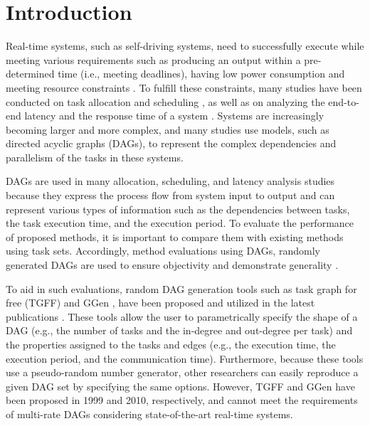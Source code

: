 \section{Introduction}
\label{sec: introduction}

Real-time systems, such as self-driving systems, need to successfully execute while meeting various requirements such as producing an output within a pre-determined time (i.e., meeting deadlines), having low power consumption and meeting resource constraints \cite{koike2021federated, senapati2021hmds, kaur2020deep}.
To fulfill these constraints, many studies have been conducted on task allocation and scheduling \cite{igarashi2021accurate, asghari2020online, tong2020ql}, as well as on analyzing the end-to-end latency and the response time of a system \cite{yang2020exploring, kordon2020evaluation, chen2021partial}.
Systems are increasingly becoming larger and more complex, and many studies use models, such as directed acyclic graphs (DAGs), to represent the complex dependencies and parallelism of the tasks in these systems.

DAGs are used in many allocation, scheduling, and latency analysis studies \cite{choi2021picas, nguyen2019cache, klaus2021constrained} because they express the process flow from system input to output and can represent various types of information such as the dependencies between tasks, the task execution time, and the execution period.
To evaluate the performance of proposed methods, it is important to compare them with existing methods using task sets.
Accordingly, method evaluations using DAGs, randomly generated DAGs are used to ensure objectivity and demonstrate generality \cite{he2021response, verucchi2020latency, senapati2021hmds}.

To aid in such evaluations, random DAG generation tools such as task graph for free (TGFF) \cite{tgff} and GGen \cite{cordeiro2010random}, have been proposed and utilized in the latest publications \cite{sun2021deepweave, huang2020hda, rouxel-free, cao2018affinity}.
These tools allow the user to parametrically specify the shape of a DAG (e.g., the number of tasks and the in-degree and out-degree per task) and the properties assigned to the tasks and edges (e.g., the execution time, the execution period, and the communication time).
Furthermore, because these tools use a pseudo-random number generator, other researchers can easily reproduce a given DAG set by specifying the same options.
However, TGFF and GGen have been proposed in 1999 and 2010, respectively, and cannot meet the requirements of multi-rate DAGs considering state-of-the-art real-time systems.

